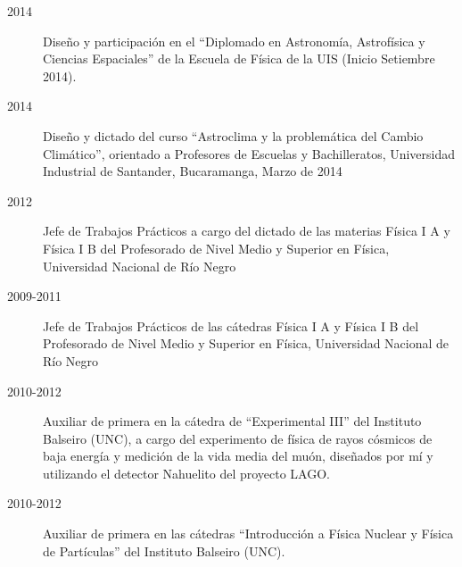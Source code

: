 \begin{description}
    \item [2014] Diseño y participación en el ``Diplomado en Astronomía, Astrofísica y Ciencias Espaciales'' de la Escuela de Física de la UIS (Inicio Setiembre 2014).
	\item [2014] Diseño y dictado del curso ``Astroclima y la problemática del Cambio Climático'', orientado a Profesores de Escuelas y Bachilleratos, Universidad Industrial de Santander, Bucaramanga, Marzo de 2014
	\item [2012] Jefe de Trabajos Prácticos a cargo del dictado de las materias Física I A y Física I B del Profesorado de Nivel Medio y Superior en Física, Universidad Nacional de Río Negro
	\item [2009-2011] Jefe de Trabajos Prácticos de las cátedras Física I A y Física I B del Profesorado de Nivel Medio y Superior en Física, Universidad Nacional de Río Negro
	\item [2010-2012] Auxiliar de primera en la cátedra de ``Experimental III'' del Instituto Balseiro (UNC), a cargo del experimento de física de rayos cósmicos de baja energía y medición de la vida media del muón, diseñados por mí y utilizando el detector Nahuelito del proyecto LAGO.
	\item [2010-2012] Auxiliar de primera en las cátedras ``Introducción a Física Nuclear y Física de Partículas'' del Instituto Balseiro (UNC).
\fi
\end{description}
\fi